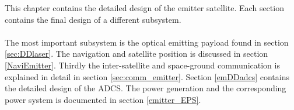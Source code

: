 This chapter contains the detailed design of the emitter satellite. Each section contains the final design of a different subsystem. 
\\\\
The most important subsystem is the optical emitting payload found in section \ref{sec:DDlaser}. The navigation and satellite position is discussed in section \ref{NaviEmitter}. Thirdly the inter-satellite and space-ground communication is explained in detail in section \ref{sec:comm_emitter}. Section \ref{emDDadcs} contains the detailed design of the \ac{ADCS}. The power generation and the corresponding power system is documented in section \ref{emitter_EPS}.
